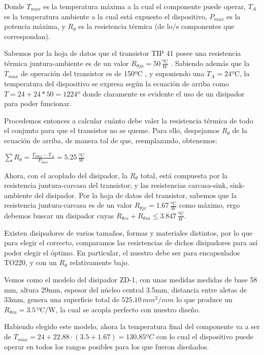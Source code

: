 \documentclass[e2_tp1_main.tex]{subfiles}
\begin{document}
Donde $T_{max}$ es la temperatura máxima a la cual el componente
puede operar, $T_{A}$ es la temperatura ambiente a la cual está expuesto
el dispositivo, $P_{max}$ es la potencia máxima, y $R_{\theta}$
es la resistencia térmica (de lo/s componentes que correspondan).

Sabemos por la hoja de datos que el transistor TIP 41 posee una resistencia
térmica juntura-ambiente es de un valor $R_{\theta ja}=50\,\frac{\text{ºC}}{W}$
. Sabiendo además que la $T_{max}$ de operación del transistor es
de 150ºC , y suponiendo una $T_{A}=24\text{ºC}$, la temperatura del
dispositivo se expresa según la ecuación de arriba como $T=24+24*50=1224\text{º}$
donde claramente es evidente el uso de un disipador para poder funcionar.

Procedemos entonces a calcular cuánto debe valer la resistencia térmica
de todo el conjunto para que el transistor no se queme. Para ello,
despejamos $R_{\theta}$ de la ecuación de arriba, de manera tal de
que, reemplazando, obtenemos:
\begin{center}
{\large{}$\sum R_{\theta}=\frac{T_{max}-T_{A}}{P_{max}}=5.25\,\frac{\text{ºC}}{W}$}{\large\par}
\par\end{center}

Ahora, con el acoplado del disipador, la $R_{\theta}$ total, está
compuesta por la resistencia juntura-carcasa del transistor; y las
resistencias carcasa-sink, sink-ambiente del disipador. Por la hoja
de datos del transistor, sabemos que la resistencia juntura-carcasa
es de un valor $R_{\theta jc}=1.67\,\frac{\text{ºC}}{W}$ como máximo,
ergo debemos buscar un disipador cuyas $R_{\theta cs}+R_{\theta sa}\leq3.847\,\frac{\text{ºC}}{W}$.

Existen disipadores de varios tamaños, formas y materiales distintos,
por lo que para elegir el correcto, comparamos las resistencias de
dichos disipadores para así poder elegir el óptimo. En particular,
el nuestro debe ser para encapsulados TO220, y con un $R_{\theta}$
relativamente bajo.

Vemos como el modelo del disipador ZD-1, con unas medidas medidas
de base 58 mm, altura 29mm, espesor del núcleo central 3.5mm, distancia
entre aletas de 33mm, genera una superficie total de $525.10\,mm^{2}/mm$
lo que produce un $R_{\theta ca}=3.5\,\text{ºC/W}$, la cual se acopla
perfecto con nuestro diseño.

Habiendo elegido este modelo, ahora la temperatura final del componente
va a ser de $T_{m\acute{a}x}=24+22.88\cdot(3.5+1.67)=130.85ºC$
con lo cual el dispositivo puede operar en todos los rangos posibles
para los que fueron diseñados.
\end{document}
